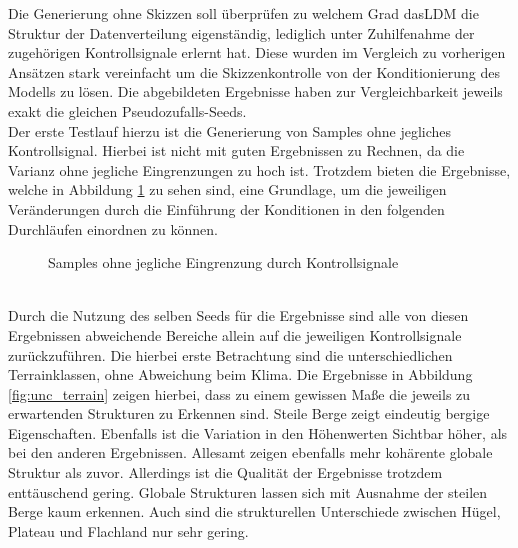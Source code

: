 Die Generierung ohne Skizzen soll überprüfen zu welchem Grad das\ac{LDM} die Struktur der Datenverteilung eigenständig, lediglich unter Zuhilfenahme der zugehörigen Kontrollsignale erlernt hat. Diese wurden im Vergleich zu vorherigen Ansätzen stark vereinfacht um die Skizzenkontrolle von der Konditionierung des Modells zu lösen. Die abgebildeten Ergebnisse haben zur Vergleichbarkeit jeweils exakt die gleichen Pseudozufalls-Seeds. \\
Der erste Testlauf hierzu ist die Generierung von Samples ohne jegliches Kontrollsignal. Hierbei ist nicht mit guten Ergebnissen zu Rechnen, da die Varianz ohne jegliche Eingrenzungen zu hoch ist. Trotzdem bieten die Ergebnisse, welche in Abbildung \ref{fig:unc_terrain_noclass} zu sehen sind, eine Grundlage, um die jeweiligen Veränderungen durch die Einführung der Konditionen in den folgenden Durchläufen einordnen zu können.
\begin{figure}[htbp]
    \centering
    \caption{Samples ohne jegliche Eingrenzung durch Kontrollsignale}
    \label{fig:unc_terrain_noclass}
\end{figure} \\
Durch die Nutzung des selben Seeds für die Ergebnisse sind alle von diesen Ergebnissen abweichende Bereiche allein auf die jeweiligen Kontrollsignale zurückzuführen. Die hierbei erste Betrachtung sind die unterschiedlichen Terrainklassen, ohne Abweichung beim Klima. Die Ergebnisse in Abbildung \ref{fig:unc_terrain} zeigen hierbei, dass zu einem gewissen Maße die jeweils zu erwartenden Strukturen zu Erkennen sind. Steile Berge zeigt eindeutig bergige Eigenschaften. Ebenfalls ist die Variation in den Höhenwerten Sichtbar höher, als bei den anderen Ergebnissen. Allesamt zeigen ebenfalls mehr kohärente globale Struktur als zuvor. Allerdings ist die Qualität der Ergebnisse trotzdem enttäuschend gering. Globale Strukturen lassen sich mit Ausnahme der steilen Berge kaum erkennen. Auch sind die strukturellen Unterschiede zwischen Hügel, Plateau und Flachland nur sehr gering. 
